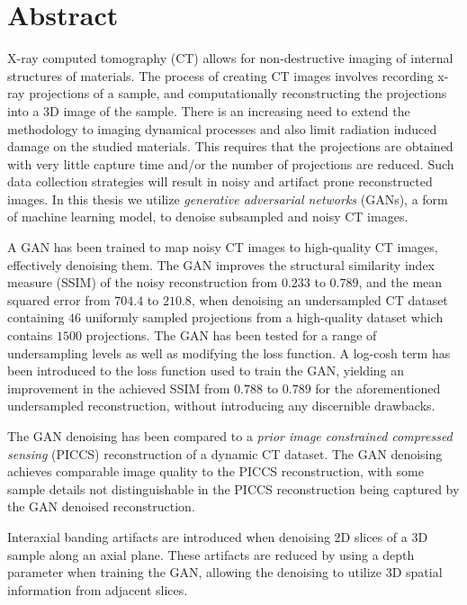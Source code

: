\chapter*{Abstract}
X-ray computed tomography (CT) allows for non-destructive imaging of internal structures of materials. The process of creating CT images involves recording x-ray projections of a sample, and computationally reconstructing the projections into a 3D image of the sample. There is an increasing need to extend the methodology to imaging dynamical processes and also limit radiation induced damage on the studied materials. This requires that the projections are obtained with very little capture time and/or the number of projections are reduced. Such data collection strategies will result in noisy and artifact prone reconstructed images. In this thesis we utilize \textit{generative adversarial networks} (GANs), a form of machine learning model, to denoise subsampled and noisy CT images. 

A GAN has been trained to map noisy CT images to high-quality CT images, effectively denoising them. The GAN improves the structural similarity index measure (SSIM) of the noisy reconstruction from $0.233$ to $0.789$, and the mean squared error from $704.4$ to $210.8$, when denoising an undersampled CT dataset containing $46$ uniformly sampled projections from a high-quality dataset which contains $1500$ projections. The GAN has been tested for a range of undersampling levels as well as modifying the loss function. A log-cosh term has been introduced to the loss function used to train the GAN, yielding an improvement in the achieved SSIM from $0.788$ to $0.789$ for the aforementioned undersampled reconstruction, without introducing any discernible drawbacks. 

The GAN denoising has been compared to a \textit{prior image constrained compressed sensing} (PICCS) reconstruction of a dynamic CT dataset. The GAN denoising achieves comparable image quality to the PICCS reconstruction, with some sample details not distinguishable in the PICCS reconstruction being captured by the GAN denoised reconstruction. 

Interaxial banding artifacts are introduced when denoising 2D slices of a 3D sample along an axial plane. These artifacts are reduced by using a depth parameter when training the GAN, allowing the denoising to utilize 3D spatial information from adjacent slices. 